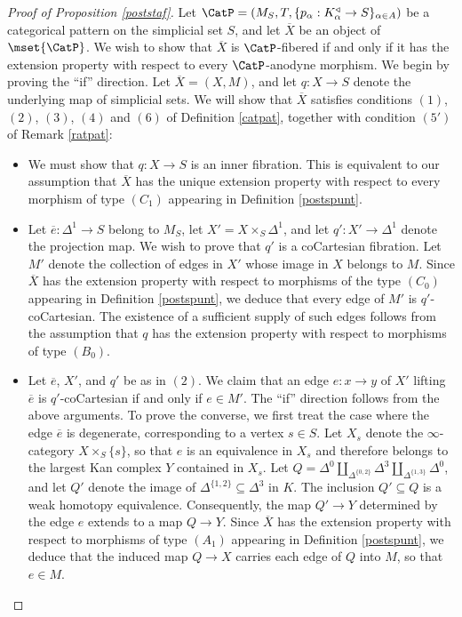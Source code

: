 \begin{proof}[Proof of Proposition \ref{poststaf}]
Let $\CatP = (M_S, T, \{ p_{\alpha}: K_{\alpha}^{\triangleleft} \rightarrow S \}_{\alpha \in A})$ be
a categorical pattern on the simplicial set $S$, and let $\overline{X}$ be an object of $\mset{ \CatP}$. We wish to show that $\overline{X}$ is $\CatP$-fibered if and only if it has the extension property with respect to every $\CatP$-anodyne morphism. We begin by proving the ``if'' direction. Let $\overline{X} = (X,M)$, and let $q: X \rightarrow S$ denote the underlying map of simplicial sets.  We will show that
$\overline{X}$ satisfies conditions $(1)$, $(2)$, $(3)$, $(4)$ and $(6)$ of Definition \ref{catpat},
together with condition $(5')$ of Remark \ref{ratpat}:

\begin{itemize}
\item[$(1)$] We must show that $q: X \rightarrow S$ is an inner fibration. This is equivalent
to our assumption that $\overline{X}$ has the unique extension property with respect to every
morphism of type $(C_1)$ appearing in Definition \ref{postspunt}.

\item[$(2)$] Let $\overline{e}: \Delta^1 \rightarrow S$ belong to $M_S$, let
$X' = X \times_{S} \Delta^1$, and let $q': X' \rightarrow \Delta^1$ denote the projection map.
We wish to prove that $q'$ is a coCartesian fibration. Let $M'$ denote the collection
of edges in $X'$ whose image in $X$ belongs to $M$.
Since $\overline{X}$ has the extension property with respect to morphisms of
the type $(C_0)$ appearing in Definition \ref{postspunt}, we deduce that every
edge of $M'$ is $q'$-coCartesian. The existence of a sufficient supply of such edges follows
from the assumption that $q$ has the extension property with respect to morphisms of type
$(B_0)$.

\item[$(3)$] Let $\overline{e}$, $X'$, and $q'$ be as in $(2)$. 
We claim that an edge $e: x \rightarrow y$ of $X'$ lifting $\overline{e}$ is $q'$-coCartesian if and only if
$e \in M'$. The ``if'' direction follows from the above arguments. To prove the converse, we
first treat the case where the edge $\overline{e}$ is degenerate, corresponding to a vertex
$s \in S$. Let $X_{s}$ denote the $\infty$-category $X \times_{S} \{s\}$, so that
$e$ is an equivalence in $X_{s}$ and therefore belongs to the largest Kan complex
$Y$ contained in $X_{s}$. Let $Q = \Delta^0 \coprod_{ \Delta^{ \{0,2\} }}
\Delta^3 \coprod_{ \Delta^{ \{1,3\} } } \Delta^0$, and let $Q'$ denote the image
of $\Delta^{ \{1,2\} } \subseteq \Delta^3$ in $K$. The inclusion $Q' \subseteq Q$
is a weak homotopy equivalence. Consequently, the map $Q' \rightarrow Y$ determined
by the edge $e$ extends to a map $Q \rightarrow Y$. Since $\overline{X}$
has the extension property with respect to morphisms of type $(A_1)$ appearing in Definition \ref{postspunt}, we deduce that the induced map $Q \rightarrow X$ carries each edge of $Q$ into
$M$, so that $e \in M$.


\end{itemize}
\end{proof}
